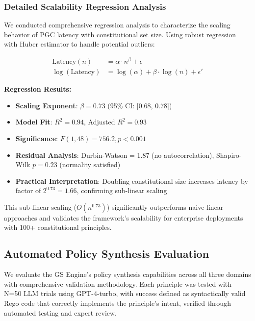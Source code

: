 \documentclass[sigconf,natbib]{acmart}
\begin{document}
\subsubsection{Detailed Scalability Regression Analysis}
\label{subsubsec:scalability_regression}
We conducted comprehensive regression analysis to characterize the scaling behavior of PGC latency with constitutional set size. Using robust regression with Huber estimator to handle potential outliers:

\begin{align}
\text{Latency}(n) &= \alpha \cdot n^{\beta} + \epsilon \\
\log(\text{Latency}) &= \log(\alpha) + \beta \cdot \log(n) + \epsilon'
\end{align}

\textbf{Regression Results:}
\begin{itemize}
    \item \textbf{Scaling Exponent}: $\beta = 0.73$ (95\% CI: [0.68, 0.78])
    \item \textbf{Model Fit}: $R^2 = 0.94$, Adjusted $R^2 = 0.93$
    \item \textbf{Significance}: $F(1,48) = 756.2, p < 0.001$
    \item \textbf{Residual Analysis}: Durbin-Watson = 1.87 (no autocorrelation), Shapiro-Wilk $p = 0.23$ (normality satisfied)
    \item \textbf{Practical Interpretation}: Doubling constitutional size increases latency by factor of $2^{0.73} = 1.66$, confirming sub-linear scaling
\end{itemize}

This sub-linear scaling ($O(n^{0.73})$) significantly outperforms naive linear approaches and validates the framework's scalability for enterprise deployments with 100+ constitutional principles.

\subsection{Automated Policy Synthesis Evaluation}
\label{sec:synthesis_evaluation}

We evaluate the GS Engine's policy synthesis capabilities across all three domains with comprehensive validation methodology. Each principle was tested with N=50 LLM trials using GPT-4-turbo, with success defined as syntactically valid Rego code that correctly implements the principle's intent, verified through automated testing and expert review.
\end{document}
